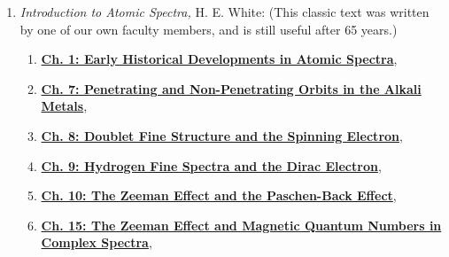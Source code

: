 \documentclass{../lab}
\begin{document}
\begin{enumerate}
    \item \emph{Introduction to Atomic Spectra,} H. E. White: (This classic text was written by one of our own faculty members, and is still useful after 65 years.)
    \begin{enumerate}
        \item \href{http://physics111.lib.berkeley.edu/Physics111/Reprints/ATM/Introduction\%20to\%20Atomic\%20Harvey\%20E.\%20White/Ch.\%201\%20early\%20historical\%20developments\%20in\%20atomic\%20spectra\_OCR.pdf}{\textbf{Ch. 1: Early Historical Developments in Atomic Spectra}},
    
        \item \href{http://physics111.lib.berkeley.edu/Physics111/Reprints/ATM/Introduction\%20to\%20Atomic\%20Harvey\%20E.\%20White/Ch.\%207\%20penetrating\%20and\%20nonpenetrating\%20orbits\%20in\%20the\%20alkali\%20metals\_OCR.pdf}{\textbf{Ch. 7: Penetrating and Non-Penetrating Orbits in the Alkali Metals}},
        
        \item \href{http://physics111.lib.berkeley.edu/Physics111/Reprints/ATM/Introduction\%20to\%20Atomic\%20Harvey\%20E.\%20White/Ch.\%208\%20doublet\%20fine\%20structure\%20and\%20the\%20spinning\%20electron\_OCR.pdf}{\textbf{Ch. 8: Doublet Fine Structure and the Spinning Electron}},
        
        \item \href{http://physics111.lib.berkeley.edu/Physics111/Reprints/ATM/Introduction\%20to\%20Atomic\%20Harvey\%20E.\%20White/Ch.\%209\%20hydrogen\%20fine\%20structure\%20and\%20the\%20dirac\%20electron\_OCR.pdf}{\textbf{Ch. 9: Hydrogen Fine Spectra and the Dirac Electron}},
        
        \item \href{http://physics111.lib.berkeley.edu/Physics111/Reprints/ATM/Introduction\%20to\%20Atomic\%20Harvey\%20E.\%20White/Ch.\%2010\%20the\%20zeeman\%20effect\%20and\%20the\%20paschen-back\%20effect\_OCR.pdf}{\textbf{Ch. 10: The Zeeman Effect and the Paschen-Back Effect}},
        
        \item \href{http://physics111.lib.berkeley.edu/Physics111/Reprints/ATM/Introduction\%20to\%20Atomic\%20Harvey\%20E.\%20White/Ch.\%2015\%20the\%20zeeman\%20effect\%20and\%20magnetic\%20quantum\%20numbers\%20in\%20complex\%20spectra\_OCR.pdf}{\textbf{Ch. 15: The Zeeman Effect and Magnetic Quantum Numbers in Complex Spectra}},
        

\end{enumerate}
\end{enumerate}
\end{document}
